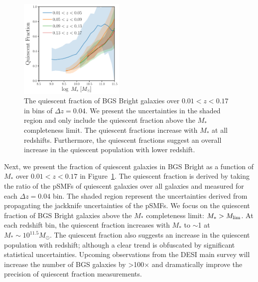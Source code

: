 \begin{figure}
\begin{center}
    \includegraphics[width=0.45\textwidth]{figs/qf_bgs_bright.pdf} 
    \caption{
        The quiescent fraction of BGS Bright galaxies over $0.01 < z < 0.17$ in
        bins of $\Delta z =0.04$.
        We present the uncertainties in the shaded region and only include  
        the quiescent fraction above the $M_*$ completeness limit. 
        The quiescent fractions increase with $M_*$ at all redshifts. 
        Furthermore, the quiescent fractions suggest an overall increase in the
        quiescent population with lower redshift.
    }\label{fig:qf}
\end{center}
\end{figure}

Next, we present the fraction of quiescent galaxies in BGS Bright as a function
of $M_*$ over $0.01 < z < 0.17$ in Figure~\ref{fig:qf}.
The quiescent fraction is derived by taking the ratio of the pSMFs of quiescent
galaxies over all galaxies and measured for each $\Delta z =0.04$ bin.
The shaded region represent the uncertainties derived from propagating the
jackknife uncertainties of the pSMFs. 
We focus on the quiescent fraction of BGS Bright galaxies above the $M_*$
completeness limit: $M_* > M_{\rm lim}$. 
At each redshift bin, the quiescent fraction increases with $M_*$ to $\sim$1 at
$M_*\sim10^{11.5}M_\odot$. 
The quiescent fraction also suggests an increase in the quiescent population
with redshift; although a clear trend is obfuscated by significant statistical
uncertainties.
Upcoming observations from the DESI main survey will increase the number of BGS
galaxies by >100$\times$ and dramatically improve the precision of quiescent
fraction measurements. 
